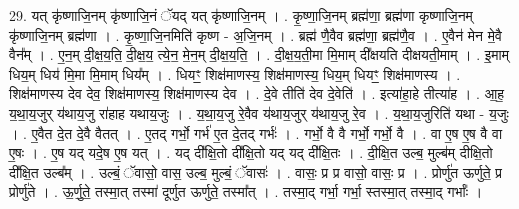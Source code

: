 \documentclass[17pt]{extarticle}
\begin{document}
29. यत् कृ॑ष्णाजि॒नम् कृ॑ष्णाजि॒नं ॅयद् यत् कृ॑ष्णाजि॒नम् । . कृ॒ष्णा॒जि॒नम् ब्रह्म॑णा॒ ब्रह्म॑णा कृष्णाजि॒नम् कृ॑ष्णाजि॒नम् ब्रह्म॑णा । . कृ॒ष्णा॒जि॒नमिति॑ कृष्ण - अ॒जि॒नम् । . ब्रह्म॑ णै॒वैव ब्रह्म॑णा॒ ब्रह्म॑णै॒व । . ए॒वैन॑ मेन मे॒वै वैन᳚म् । . ए॒न॒म् दी॒क्ष॒य॒ति॒ दी॒क्ष॒य॒ त्ये॒न॒ मे॒न॒म् दी॒क्ष॒य॒ति॒ । . दी॒क्ष॒य॒ती॒मा मि॒माम् दी᳚क्षयति दीक्षयती॒माम् । . इ॒माम् धिय॒म् धिय॑ मि॒मा मि॒माम् धिय᳚म् । . धियꣳ॒॒ शिक्ष॑माणस्य॒ शिक्ष॑माणस्य॒ धिय॒म् धियꣳ॒॒ शिक्ष॑माणस्य । . शिक्ष॑माणस्य देव देव॒ शिक्ष॑माणस्य॒ शिक्ष॑माणस्य देव । . दे॒वे तीति॑ देव दे॒वेति॑ । . इत्या॑हा॒हे तीत्या॑ह । . आ॒ह॒ य॒था॒य॒जुर् य॑थाय॒जु रा॑हाह यथाय॒जुः । . य॒था॒य॒जु रे॒वैव य॑थाय॒जुर् य॑थाय॒जु रे॒व । . य॒था॒य॒जुरिति॑ यथा - य॒जुः । . ए॒वैत दे॒त दे॒वै वैतत् । . ए॒तद् गर्भो॒ गर्भ॑ ए॒त दे॒तद् गर्भः॑ । . गर्भो॒ वै वै गर्भो॒ गर्भो॒ वै । . वा ए॒ष ए॒ष वै वा ए॒षः । . ए॒ष यद् यदे॒ष ए॒ष यत् । . यद् दी᳚क्षि॒तो दी᳚क्षि॒तो यद् यद् दी᳚क्षि॒तः । . दी॒क्षि॒त उल्ब॒ मुल्ब॑म् दीक्षि॒तो दी᳚क्षि॒त उल्ब᳚म् । . उल्बं॒ ॅवासो॒ वास॒ उल्ब॒ मुल्बं॒ ॅवासः॑ । . वासः॒ प्र प्र वासो॒ वासः॒ प्र । . प्रोर्णु॑त ऊर्णुते॒ प्र प्रोर्णु॑ते । . ऊ॒र्णु॒ते॒ तस्मा॒त् तस्मा॑ दूर्णुत ऊर्णुते॒ तस्मा᳚त् । . तस्मा॒द् गर्भा॒ गर्भा॒ स्तस्मा॒त् तस्मा॒द् गर्भाः᳚ । \newline
\end{document}
